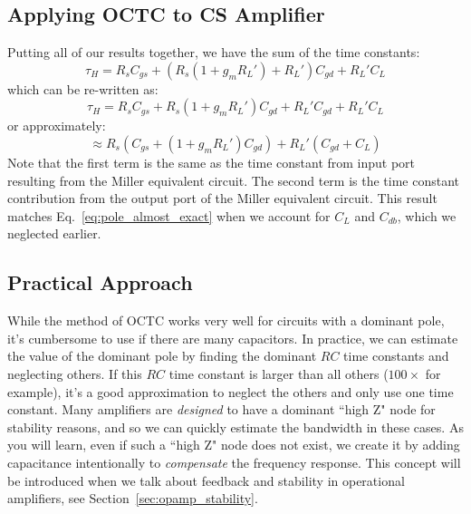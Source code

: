 \subsection{Applying OCTC to CS Amplifier}
Putting all of our results together, we have the sum of the time constants:
\begin{equation} 
	{\tau _H} = R_s{C_{gs}} + \left( {R_s(1 + {g_m}R_L') + R_L'} \right){C_{gd}} + R_L'{C_L}
\end{equation}
which can be re-written as:
\begin{equation} 
	{\tau _H} = R_s{C_{gs}} + R_s(1 + {g_m}R_L'){C_{gd}} + R_L'{C_{gd}} + R_L'{C_L} 
\end{equation}
or approximately:
\begin{equation} 
	 \approx R_s\left( {{C_{gs}} + (1 + {g_m}R_L'){C_{gd}}} \right) + R_L'\left( {{C_{gd}} + {C_L}} \right)
\end{equation}
Note that the first term is the same as the time constant from input port resulting from the Miller equivalent circuit.  The second term is the time constant contribution from the output port of the Miller equivalent circuit.  This result matches Eq.~\ref{eq:pole_almost_exact} when we account for $C_L$ and $C_{db}$, which we neglected earlier.
\subsection{Practical Approach}
While the method of OCTC works very well for circuits with a dominant pole, it's cumbersome to use if there are many capacitors.  In practice, we can estimate the value of the dominant pole by finding the dominant $RC$ time constants and neglecting others.  If this $RC$ time constant is larger than all others ($100\times$ for example), it's a good approximation to neglect the others and only use one time constant. Many amplifiers are \textit{designed} to have a dominant ``high Z" node for stability reasons, and so we can quickly estimate the bandwidth in these cases.  As you will learn, even if such a ``high Z" node does not exist, we create it by adding capacitance intentionally to \textit{compensate} the frequency response.  This concept will be introduced when we talk about feedback and stability in operational amplifiers, see Section~\ref{sec:opamp_stability}.
